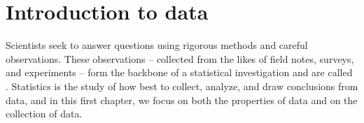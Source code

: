 \chapter{Introduction to data}
\label{introductionToData}
\label{ch_intro_to_data}
\renewcommand{\chapterfolder}{ch_intro_to_data}


Scientists seek to answer questions using rigorous methods
and careful observations.
These observations -- collected from the likes of field notes,
surveys, and experiments -- form the backbone of a statistical
investigation and are called .
Statistics is the study of how best to collect, analyze,
and draw conclusions from data, %
and in this first chapter,
we focus on both the properties of data
and on the collection of data.


